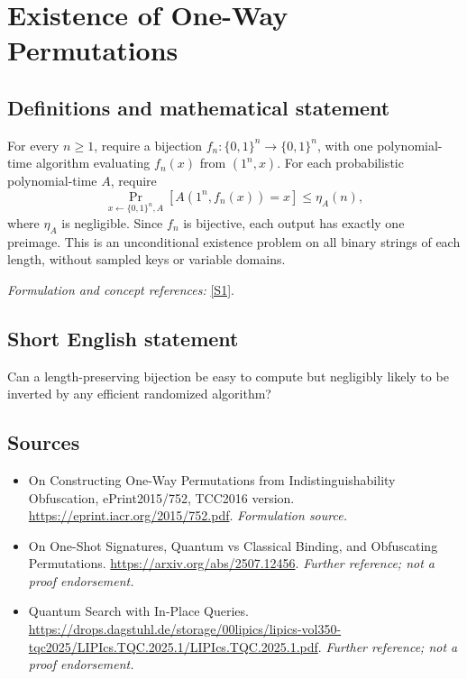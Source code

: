 \documentclass[11pt]{article}
\begin{document}
\section*{\texorpdfstring{Existence of One-Way Permutations}{Existence of One-Way Permutations}}\label{statement}
\subsection{Definitions and mathematical statement}
For every $n\ge1$, require a bijection $f_n:\{0,1\}^n\to\{0,1\}^n$, with one polynomial-time algorithm evaluating $f_n(x)$ from $(1^n,x)$. For each probabilistic polynomial-time $A$, require
\[
 \Pr_{x\leftarrow\{0,1\}^n,A}[A(1^n,f_n(x))=x]\le\eta_A(n),
\]
where $\eta_A$ is negligible. Since $f_n$ is bijective, each output has exactly one preimage. This is an unconditional existence problem on all binary strings of each length, without sampled keys or variable domains.
\par\smallskip\textit{Formulation and concept references:} \href{https://eprint.iacr.org/2015/752.pdf}{[S1]}.

\subsection{Short English statement}
Can a length-preserving bijection be easy to compute but negligibly likely to be inverted by any efficient randomized algorithm?
\subsection{Sources}
\begin{itemize}
\item[S1]On Constructing One-Way Permutations from Indistinguishability Obfuscation, ePrint2015/752, TCC2016 version.
\url{https://eprint.iacr.org/2015/752.pdf}.
\textit{Formulation source.}
\item[S2]On One-Shot Signatures, Quantum vs Classical Binding, and Obfuscating Permutations.
\url{https://arxiv.org/abs/2507.12456}.
\textit{Further reference; not a proof endorsement.}
\item[S3]Quantum Search with In-Place Queries.
\url{https://drops.dagstuhl.de/storage/00lipics/lipics-vol350-tqc2025/LIPIcs.TQC.2025.1/LIPIcs.TQC.2025.1.pdf}.
\textit{Further reference; not a proof endorsement.}
\end{itemize}
\end{document}
